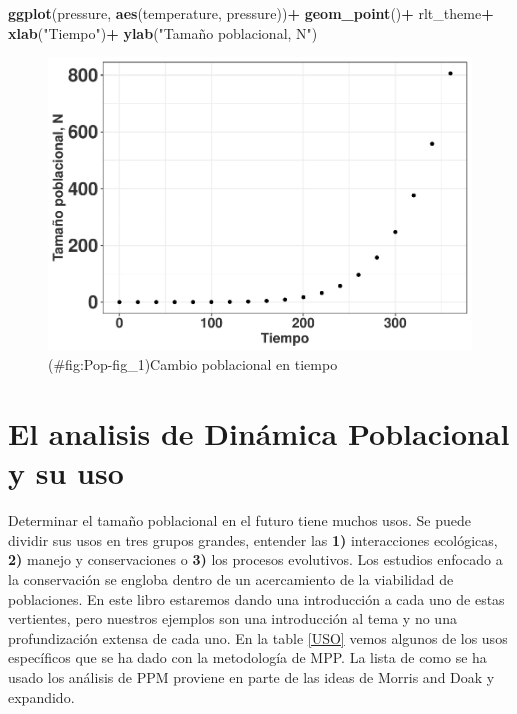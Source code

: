 \documentclass[
]{book}
\newenvironment{Shaded}{\begin{snugshade}}{\end{snugshade}}
\newcommand{\FunctionTok}[1]{\textcolor[rgb]{0.13,0.29,0.53}{\textbf{#1}}}
\newcommand{\NormalTok}[1]{#1}
\newcommand{\SpecialCharTok}[1]{\textcolor[rgb]{0.81,0.36,0.00}{\textbf{#1}}}
\newcommand{\StringTok}[1]{\textcolor[rgb]{0.31,0.60,0.02}{#1}}
\theoremstyle{definition}
\theoremstyle{definition}
\theoremstyle{definition}
\theoremstyle{definition}
\theoremstyle{remark}
\begin{document}
\begin{Shaded}
\begin{Highlighting}[]
\FunctionTok{ggplot}\NormalTok{(pressure, }\FunctionTok{aes}\NormalTok{(temperature, pressure))}\SpecialCharTok{+}
  \FunctionTok{geom\_point}\NormalTok{()}\SpecialCharTok{+}
\NormalTok{  rlt\_theme}\SpecialCharTok{+}
  \FunctionTok{xlab}\NormalTok{(}\StringTok{"Tiempo"}\NormalTok{)}\SpecialCharTok{+}
  \FunctionTok{ylab}\NormalTok{(}\StringTok{"Tamaño poblacional, N"}\NormalTok{)}
\end{Highlighting}
\end{Shaded}

\begin{figure}
\centering
\includegraphics{Diagnostico_Poblacional_files/figure-latex/Pop-fig_1-1.pdf}
\caption{(\#fig:Pop-fig\_1)Cambio poblacional en tiempo}
\end{figure}

\section{El analisis de Dinámica Poblacional y su uso}\label{el-analisis-de-dinuxe1mica-poblacional-y-su-uso}

Determinar el tamaño poblacional en el futuro tiene muchos usos. Se puede dividir sus usos en tres grupos grandes, entender las \textbf{1)} interacciones ecológicas, \textbf{2)} manejo y conservaciones o \textbf{3)} los procesos evolutivos. Los estudios enfocado a la conservación se engloba dentro de un acercamiento de la viabilidad de poblaciones. En este libro estaremos dando una introducción a cada uno de estas vertientes, pero nuestros ejemplos son una introducción al tema y no una profundización extensa de cada uno. En la table \ref{USO} vemos algunos de los usos específicos que se ha dado con la metodología de MPP. La lista de como se ha usado los análisis de PPM proviene en parte de las ideas de Morris and Doak \citep{morris2002quantitative} y expandido.
\end{document}
